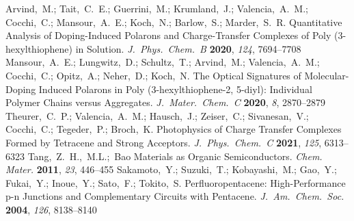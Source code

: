 \documentclass[journal=jpclcd,manuscript=letter]{achemso}
\begin{document}
\begin{mcitethebibliography}{51}
Arvind,~M.; Tait,~C.~E.; Guerrini,~M.; Krumland,~J.; Valencia,~A.~M.;
  Cocchi,~C.; Mansour,~A.~E.; Koch,~N.; Barlow,~S.; Marder,~S.~R.
    Quantitative Analysis of Doping-Induced Polarons and
  Charge-Transfer Complexes of Poly (3-hexylthiophene) in Solution.
  \emph{J.~Phys.~Chem.~B} \textbf{2020}, \emph{124}, 7694--7708\relax
\mciteBstWouldAddEndPuncttrue
\mciteSetBstMidEndSepPunct{\mcitedefaultmidpunct}
{\mcitedefaultendpunct}{\mcitedefaultseppunct}\relax
\EndOfBibitem
{}
Mansour,~A.~E.; Lungwitz,~D.; Schultz,~T.; Arvind,~M.; Valencia,~A.~M.;
  Cocchi,~C.; Opitz,~A.; Neher,~D.; Koch,~N. The Optical Signatures of
  Molecular-Doping Induced Polarons in Poly (3-hexylthiophene-2, 5-diyl):
  Individual Polymer Chains versus Aggregates. \emph{J.~Mater.~Chem.~C}
  \textbf{2020}, \emph{8}, 2870--2879\relax
\mciteBstWouldAddEndPuncttrue
\mciteSetBstMidEndSepPunct{\mcitedefaultmidpunct}
{\mcitedefaultendpunct}{\mcitedefaultseppunct}\relax
\EndOfBibitem
{}
Theurer,~C.~P.; Valencia,~A.~M.; Hausch,~J.; Zeiser,~C.; Sivanesan,~V.;
  Cocchi,~C.; Tegeder,~P.; Broch,~K. Photophysics of Charge Transfer Complexes
  Formed by Tetracene and Strong Acceptors. \emph{J.~Phys.~Chem.~C}
  \textbf{2021}, \emph{125}, 6313--6323\relax
\mciteBstWouldAddEndPuncttrue
\mciteSetBstMidEndSepPunct{\mcitedefaultmidpunct}
{\mcitedefaultendpunct}{\mcitedefaultseppunct}\relax
\EndOfBibitem
{}
Tang,~Z.~H.,~M.L.;~Bao Materials as Organic Semiconductors. \emph{Chem. Mater.}
  \textbf{2011}, \emph{23}, 446--455\relax
\mciteBstWouldAddEndPuncttrue
\mciteSetBstMidEndSepPunct{\mcitedefaultmidpunct}
{\mcitedefaultendpunct}{\mcitedefaultseppunct}\relax
\EndOfBibitem
{}
Sakamoto,~Y.; Suzuki,~T.; Kobayashi,~M.; Gao,~Y.; Fukai,~Y.; Inoue,~Y.;
  Sato,~F.; Tokito,~S. Perfluoropentacene: High-Performance p-n Junctions and
  Complementary Circuits with Pentacene. \emph{J.~Am.~Chem.~Soc.~}
  \textbf{2004}, \emph{126}, 8138--8140\relax
\mciteBstWouldAddEndPuncttrue
\mciteSetBstMidEndSepPunct{\mcitedefaultmidpunct}
{\mcitedefaultendpunct}{\mcitedefaultseppunct}\relax
\EndOfBibitem
{}

\end{mcitethebibliography}
\end{document}
